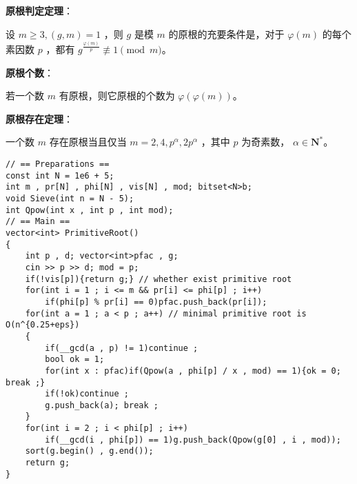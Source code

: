 \begin{tcolorbox}
\textbf{原根判定定理}：

设 $m \ge 3, (g,m)=1$ ，则 $g$ 是模 $m$ 的原根的充要条件是，对于 $\varphi(m)$ 的每个素因数 $p$ ，都有
$g^{\frac{\varphi(m)}{p}}\not\equiv 1\pmod m$。
\end{tcolorbox}


\begin{tcolorbox}
\textbf{原根个数}：

若一个数 $m$ 有原根，则它原根的个数为 $\varphi(\varphi(m))$。
\end{tcolorbox}


\begin{tcolorbox}
\textbf{原根存在定理}：

一个数 $m$ 存在原根当且仅当 $m=2,4,p^{\alpha},2p^{\alpha}$ ，其中 $p$ 为奇素数， $\alpha\in \mathbf{N}^{*}$。
\end{tcolorbox}

\begin{verbatim}
// == Preparations ==
const int N = 1e6 + 5; 
int m , pr[N] , phi[N] , vis[N] , mod; bitset<N>b;
void Sieve(int n = N - 5);
int Qpow(int x , int p , int mod);
// == Main ==
vector<int> PrimitiveRoot()
{
    int p , d; vector<int>pfac , g;
    cin >> p >> d; mod = p;
    if(!vis[p]){return g;} // whether exist primitive root
    for(int i = 1 ; i <= m && pr[i] <= phi[p] ; i++)
        if(phi[p] % pr[i] == 0)pfac.push_back(pr[i]);
    for(int a = 1 ; a < p ; a++) // minimal primitive root is O(n^{0.25+eps})
    {
        if(__gcd(a , p) != 1)continue ;
        bool ok = 1;
        for(int x : pfac)if(Qpow(a , phi[p] / x , mod) == 1){ok = 0; break ;}
        if(!ok)continue ;
        g.push_back(a); break ;
    }
    for(int i = 2 ; i < phi[p] ; i++)
        if(__gcd(i , phi[p]) == 1)g.push_back(Qpow(g[0] , i , mod));
    sort(g.begin() , g.end());
    return g;
}
\end{verbatim}